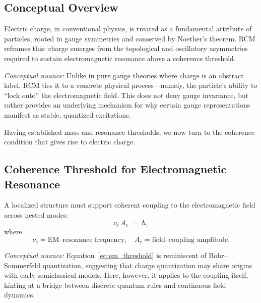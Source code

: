 \subsection{Conceptual Overview}
Electric charge, in conventional physics, is treated as a fundamental attribute of particles, rooted in gauge symmetries and conserved by Noether’s theorem.  RCM reframes this: charge emerges from the topological and oscillatory asymmetries required to sustain electromagnetic resonance above a coherence threshold.  

\vspace{1ex}
\noindent\emph{Conceptual nuance:} Unlike in pure gauge theories where charge is an abstract label, RCM ties it to a concrete physical process—namely, the particle’s ability to “lock onto” the electromagnetic field.  This does not deny gauge invariance, but rather provides an underlying mechanism for why certain gauge representations manifest as stable, quantized excitations.

\bigskip
Having established mass and resonance thresholds, we now turn to the coherence condition that gives rise to electric charge.

\subsection{Coherence Threshold for Electromagnetic Resonance}
A localized structure must support coherent coupling to the electromagnetic field across nested modes:
\begin{equation}\label{eq:em_threshold}
\nu_e\,A_e \;=\;\hbar,
\end{equation}
where
\[
\nu_e=\text{EM–resonance frequency}, 
\quad
A_e=\text{field–coupling amplitude}.
\]

\vspace{1ex}
\noindent\emph{Conceptual nuance:}  Equation~\eqref{eq:em_threshold} is reminiscent of Bohr–Sommerfeld quantization, suggesting that charge quantization may share origins with early semiclassical models.  Here, however, it applies to the coupling itself, hinting at a bridge between discrete quantum rules and continuous field dynamics.

